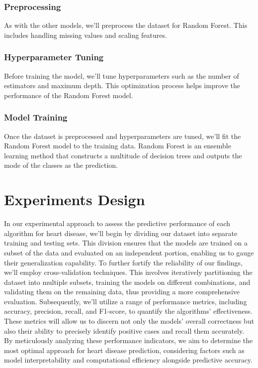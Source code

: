 \subsubsection{Preprocessing}
As with the other models, we'll preprocess the dataset for Random Forest. This includes handling missing values and scaling features.

\subsubsection{Hyperparameter Tuning}
Before training the model, we'll tune hyperparameters such as the number of estimators and maximum depth. This optimization process helps improve the performance of the Random Forest model.

\subsubsection{Model Training}
Once the dataset is preprocessed and hyperparameters are tuned, we'll fit the Random Forest model to the training data. Random Forest is an ensemble learning method that constructs a multitude of decision trees and outputs the mode of the classes as the prediction.

\section{Experiments Design}
In our experimental approach to assess the predictive performance of each algorithm for heart disease, we'll begin by dividing our dataset into separate training and testing sets. This division ensures that the models are trained on a subset of the data and evaluated on an independent portion, enabling us to gauge their generalization capability. To further fortify the reliability of our findings, we'll employ cross-validation techniques. This involves iteratively partitioning the dataset into multiple subsets, training the models on different combinations, and validating them on the remaining data, thus providing a more comprehensive evaluation. Subsequently, we'll utilize a range of performance metrics, including accuracy, precision, recall, and F1-score, to quantify the algorithms' effectiveness. These metrics will allow us to discern not only the models' overall correctness but also their ability to precisely identify positive cases and recall them accurately. By meticulously analyzing these performance indicators, we aim to determine the most optimal approach for heart disease prediction, considering factors such as model interpretability and computational efficiency alongside predictive accuracy.


